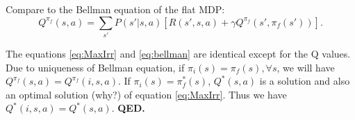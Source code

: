 Compare to the Bellman equation of the flat MDP:
\begin{equation}
    Q^{\pi_f}(s, a) = \sum_{s'}P(s'|s, a)[R(s', s, a) + \gamma Q^{\pi_f}(s', \pi_f(s'))].
    \label{eq:bellman}
\end{equation}

The equations \ref{eq:MaxIrr} and \ref{eq:bellman} are identical except for the Q values.
Due to uniqueness of Bellman equation, if $\pi_i(s) = \pi_f(s), \forall s$, we will have $Q^{\pi_f}(s, a) = Q^{\pi_f}(i, s, a)$. 
If $\pi_i(s) = \pi^*_f(s)$, $Q^*(s, a)$ is a solution and also an optimal solution (why?) of equation \ref{eq:MaxIrr}.
Thus we have $Q^*(i, s, a) = Q^*(s, a)$. \textbf{QED.}





